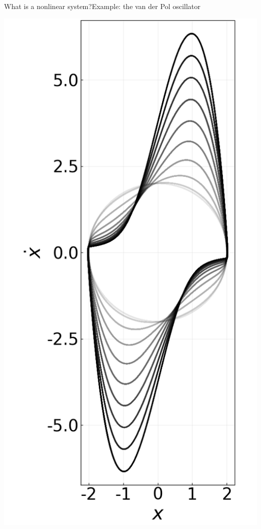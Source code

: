 \documentclass[usenames,dvipsnames,svgnames,10pt,aspectratio=169]{beamer}
\begin{document}
\begin{frame}[t, c]{What is a nonlinear system?}{Example: the van der Pol oscillator}
\begin{minipage}{.38\textwidth}
		\includegraphics[height=.75\textheight]{van_der_pol_limit_cycle}
	\end{minipage}

	\vspace{1cm}
\end{frame}
\end{document}

